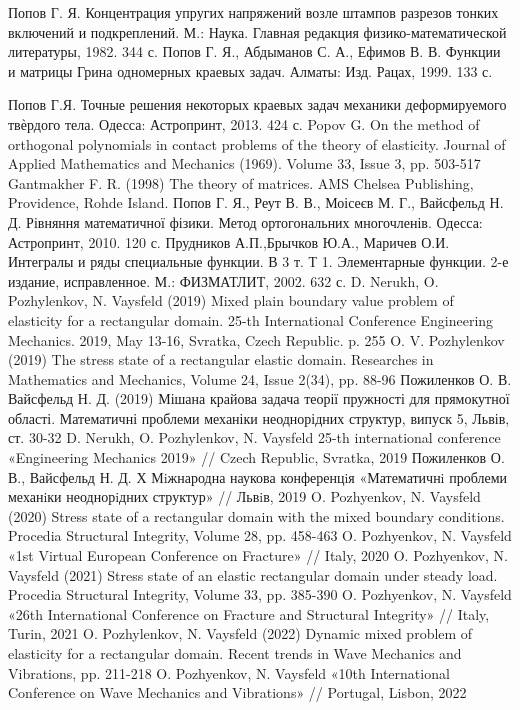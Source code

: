 \documentclass[a4paper,14pt]{extarticle}
\numberwithin{equation}{section}
\begin{document}
\begin{thebibliography}{1}
    Попов Г. Я. Концентрация упругих напряжений возле штампов разрезов тонких включений и подкреплений. М.: Наука. Главная редакция физико-математической литературы, 1982. 344 с.
    Попов Г. Я., Абдыманов С. А., Ефимов В. В. Функции и матрицы Грина одномерных краевых задач. Алматы: Изд. Рацах, 1999. 133 с.

    Попов Г.Я. Точные решения некоторых краевых задач механики деформируемого твѐрдого тела. Одесса: Астропринт, 2013. 424 с.
    Popov G. On the method of orthogonal polynomials in contact problems of the theory of elasticity. Journal of Applied Mathematics and Mechanics (1969). Volume 33, Issue 3, pp. 503-517
    Gantmakher F. R. (1998) The theory of matrices. AMS Chelsea Publishing, Providence, Rohde Island.
    Попов Г. Я., Реут В. В., Моісеєв М. Г., Вайсфельд Н. Д. Рівняння математичної фізики. Метод ортогональних многочленів. Одесса: Астропринт, 2010. 120 с.
    Прудников А.П.,Брычков Ю.А., Маричев О.И. Интегралы и ряды специальные функции. В 3 т. Т 1. Элементарные функции. 2-е издание, исправленное. М.: ФИЗМАТЛИТ, 2002. 632 с.
    D. Nerukh, O. Pozhylenkov, N. Vaysfeld (2019) Mixed plain boundary value problem of elasticity for a rectangular domain. 25-th International Conference Engineering Mechanics. 2019, May 13-16, Svratka, Czech Republic. p. 255
    O. V. Pozhylenkov (2019) The stress state of a rectangular elastic domain. Researches in Mathematics and Mechanics, Volume 24, Issue 2(34), pp. 88-96
    Пожиленков О. В. Вайсфельд Н. Д. (2019) Мішана крайова задача теорії пружності для прямокутної області. Математичні проблеми механіки неоднорідних структур, випуск 5, Львів, ст. 30-32
    D. Nerukh, O. Pozhylenkov, N. Vaysfeld 25-th international conference «Engineering Mechanics 2019» // Czech Republic, Svratka, 2019
    Пожиленков О. В., Вайсфельд Н. Д. Х Мiжнародна наукова конференцiя «Математичнi проблеми механiки неоднорiдних структур» // Львiв, 2019
    O. Pozhyenkov, N. Vaysfeld (2020) Stress state of a rectangular domain with the mixed boundary conditions. Procedia Structural Integrity, Volume 28, pp. 458-463
    O. Pozhyenkov, N. Vaysfeld «1st Virtual European Conference on Fracture» // Italy, 2020
    O. Pozhyenkov, N. Vaysfeld (2021) Stress state of an elastic rectangular domain under steady load. Procedia Structural Integrity, Volume 33, pp. 385-390
    O. Pozhyenkov, N. Vaysfeld «26th International Conference on Fracture and Structural Integrity» // Italy, Turin, 2021
    O. Pozhylenkov, N. Vaysfeld (2022) Dynamic mixed problem of elasticity for a rectangular domain. Recent trends in Wave Mechanics and Vibrations, pp. 211-218
    O. Pozhyenkov, N. Vaysfeld «10th International Conference on Wave Mechanics and Vibrations» // Portugal, Lisbon, 2022
\end{thebibliography}
\newpage
\end{document}
